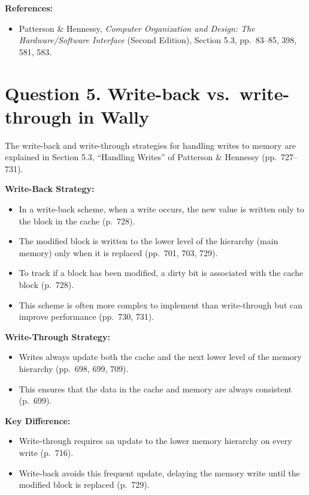 \documentclass[11pt]{article}
\begin{document}
\textbf{References:}
\begin{itemize}
  \item Patterson \& Hennessy, \emph{Computer Organization and Design: The Hardware/Software Interface} (Second Edition), Section 5.3, pp.~83--85, 398, 581, 583.
\end{itemize}

\section*{Question 5. Write-back vs.\ write-through in Wally}

The write-back and write-through strategies for handling writes to memory are explained in Section 5.3, ``Handling Writes'' of Patterson \& Hennessy (pp.~727--731).

\textbf{Write-Back Strategy:}
\begin{itemize}
  \item In a write-back scheme, when a write occurs, the new value is written only to the block in the cache (p.~728).
  \item The modified block is written to the lower level of the hierarchy (main memory) only when it is replaced (pp.~701, 703, 729).
  \item To track if a block has been modified, a dirty bit is associated with the cache block (p.~728).
  \item This scheme is often more complex to implement than write-through but can improve performance (pp.~730, 731).
\end{itemize}

\textbf{Write-Through Strategy:}
\begin{itemize}
  \item Writes always update both the cache and the next lower level of the memory hierarchy (pp.~698, 699, 709).
  \item This ensures that the data in the cache and memory are always consistent (p.~699).
\end{itemize}

\textbf{Key Difference:}
\begin{itemize}
  \item Write-through requires an update to the lower memory hierarchy on every write (p.~716).
  \item Write-back avoids this frequent update, delaying the memory write until the modified block is replaced (p.~729).
\end{itemize}
\end{document}
